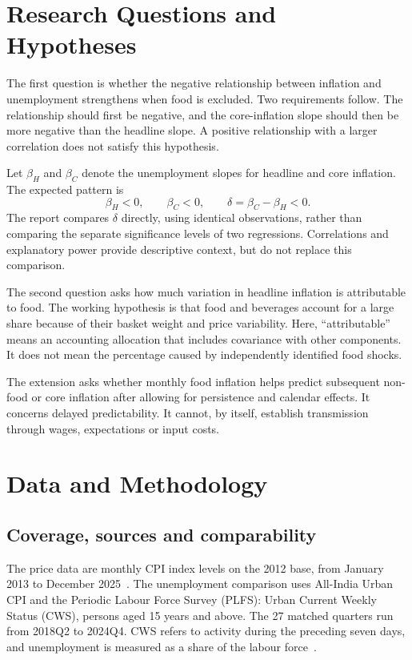 \documentclass[11pt,a4paper]{article}
\begin{document}
\section{Research Questions and Hypotheses}

The first question is whether the negative relationship between inflation and unemployment strengthens when food is excluded. Two requirements follow. The relationship should first be negative, and the core-inflation slope should then be more negative than the headline slope. A positive relationship with a larger correlation does not satisfy this hypothesis.

Let $\beta_H$ and $\beta_C$ denote the unemployment slopes for headline and core inflation. The expected pattern is
\begin{equation}
\beta_H<0,\qquad \beta_C<0,\qquad
\delta=\beta_C-\beta_H<0.
\label{eq:hypotheses}
\end{equation}
The report compares $\delta$ directly, using identical observations, rather than comparing the separate significance levels of two regressions. Correlations and explanatory power provide descriptive context, but do not replace this comparison.

The second question asks how much variation in headline inflation is attributable to food. The working hypothesis is that food and beverages account for a large share because of their basket weight and price variability. Here, ``attributable'' means an accounting allocation that includes covariance with other components. It does not mean the percentage caused by independently identified food shocks.

The extension asks whether monthly food inflation helps predict subsequent non-food or core inflation after allowing for persistence and calendar effects. It concerns delayed predictability. It cannot, by itself, establish transmission through wages, expectations or input costs.

\section{Data and Methodology}
\subsection{Coverage, sources and comparability}

The price data are monthly CPI index levels on the 2012 base, from January 2013 to December 2025~\cite{cpiapi}. The unemployment comparison uses All-India Urban CPI and the Periodic Labour Force Survey (PLFS): Urban Current Weekly Status (CWS), persons aged 15 years and above. The 27 matched quarters run from 2018Q2 to 2024Q4. CWS refers to activity during the preceding seven days, and unemployment is measured as a share of the labour force~\cite{plfs2024}.
\end{document}

